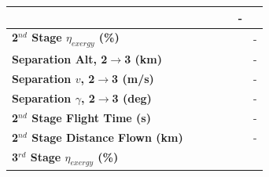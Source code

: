 \begin{table}[ht]
\begin{tabular}{l c c c c c c}
			& \firstsecondSeparationgammaCdThreeNinetyFiveNoReturn
			& \firstsecondSeparationgammaCdThreeStandardNoReturn
			& \firstsecondSeparationgammaCdThreeOneOneHundredFiveNoReturn
			& \firstsecondSeparationgammaCdThreeOneHundredTenNoReturn
			& -
			\\
			\hline 
			\textbf{2$^{nd}$ Stage $\eta_{exergy}$ (\%)}
			& \textbf{\secondExergyEffCdThreeNinetyNoReturn}
			& \textbf{\secondExergyEffCdThreeNinetyFiveNoReturn}
			& \textbf{\secondExergyEffCdThreeStandardNoReturn}
			& \textbf{\secondExergyEffCdThreeOneOneHundredFiveNoReturn}
			& \textbf{\secondExergyEffCdThreeOneHundredTenNoReturn}
			& -
			\\
			\textbf{Separation Alt, 2$\rightarrow$3 (km)}
			& \secondthirdSeparationAltCdThreeNinetyNoReturn
			& \secondthirdSeparationAltCdThreeNinetyFiveNoReturn
			& \secondthirdSeparationAltCdThreeStandardNoReturn
			& \secondthirdSeparationAltCdThreeOneOneHundredFiveNoReturn
			& \secondthirdSeparationAltCdThreeOneHundredTenNoReturn
			& -
			\\
			\textbf{Separation $v$, 2$\rightarrow$3 (m/s)}
			& \secondthirdSeparationvCdThreeNinetyNoReturn
			& \secondthirdSeparationvCdThreeNinetyFiveNoReturn
			& \secondthirdSeparationvCdThreeStandardNoReturn
			& \secondthirdSeparationvCdThreeOneOneHundredFiveNoReturn
			& \secondthirdSeparationvCdThreeOneHundredTenNoReturn
			& -
			\\
			\textbf{Separation $\gamma$, 2$\rightarrow$3 (deg)}
			& \secondthirdSeparationgammaCdThreeNinetyNoReturn
			& \secondthirdSeparationgammaCdThreeNinetyFiveNoReturn
			& \secondthirdSeparationgammaCdThreeStandardNoReturn
			& \secondthirdSeparationgammaCdThreeOneOneHundredFiveNoReturn
			& \secondthirdSeparationgammaCdThreeOneHundredTenNoReturn
			& -
			\\
			\textbf{2$^{nd}$ Stage Flight Time (s)}
			& \secondFlightTimeCdThreeNinetyNoReturn
			& \secondFlightTimeCdThreeNinetyFiveNoReturn
			& \secondFlightTimeCdThreeStandardNoReturn
			& \secondFlightTimeCdThreeOneOneHundredFiveNoReturn
			& \secondFlightTimeCdThreeOneHundredTenNoReturn
			& -
			\\
			\textbf{2$^{nd}$ Stage Distance Flown (km)}
			& \SecondDistCdThreeNinetyNoReturn
			& \SecondDistCdThreeNinetyFiveNoReturn
			& \SecondDistCdThreeStandardNoReturn
			& \SecondDistCdThreeOneOneHundredFiveNoReturn
			& \SecondDistCdThreeOneHundredTenNoReturn
			& -
			\\
			\hline 
			\textbf{3$^{rd}$ Stage $\eta_{exergy}$ (\%)}
			& \textbf{\thirddExergyEffCdThreeNinetyNoReturn}

\end{tabular}
\end{table}
